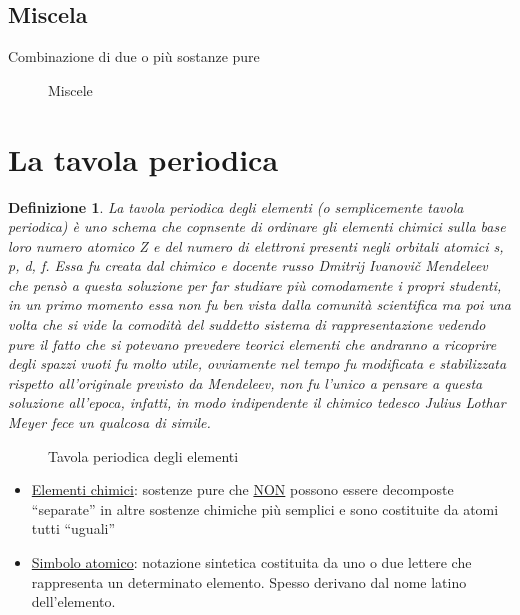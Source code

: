 \documentclass{book}
\newtheorem{defi}{Definizione}[section]
\begin{document}
\subsection{Miscela}
\label{sec:misc}

Combinazione di due o più sostanze pure
\begin{figure}[ht!]
  \centering
  \resizebox{5.5in}{!}{}
  \caption{Miscele}
  \label{fig:miscela}
\end{figure}
\section{La tavola periodica}
\label{sec:tavper}
\begin{defi}
  La tavola periodica degli elementi (o semplicemente tavola periodica) è uno schema che copnsente di ordinare
  gli elementi chimici sulla base loro numero atomico Z e del numero di elettroni presenti negli orbitali
  atomici s, p, d, f. Essa fu creata dal chimico e docente russo Dmitrij Ivanovič Mendeleev che pensò a questa
  soluzione per far studiare più comodamente i propri studenti, in un primo momento essa non fu ben vista
  dalla comunità scientifica ma poi una volta che si vide la comodità del suddetto sistema di rappresentazione
  vedendo pure il fatto che si potevano prevedere teorici elementi che andranno a ricoprire degli spazzi vuoti
  fu molto utile, ovviamente nel tempo fu modificata e stabilizzata rispetto all'originale previsto da
  Mendeleev, non fu l'unico a pensare a questa soluzione all'epoca, infatti, in modo indipendente il chimico
  tedesco Julius Lothar Meyer fece un qualcosa di simile.
\end{defi}
\begin{figure}[ht!]
  \centering
  \resizebox{5.5in}{!}{} 
  \caption{Tavola periodica degli elementi}
  \label{fig:tavper}
\end{figure}
\begin{itemize}
\item \underline{Elementi chimici}: sostenze pure che \underline{NON} possono essere decomposte ``separate'' in altre
  sostenze chimiche più semplici e sono costituite da atomi tutti ``uguali''
\item \underline{Simbolo atomico}: notazione sintetica costituita da uno o due lettere che rappresenta un determinato
  elemento. Spesso derivano dal nome latino dell'elemento.
\end{itemize}
\end{document}
